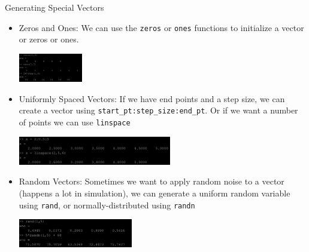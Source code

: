 {}\documentclass[letterpaper,
compress,
xcolor=x11names,
]{beamer}
\begin{document}

\begin{frame}{Generating Special Vectors}
	\footnotesize
	\begin{itemize}
		\item Zeros and Ones: We can use the \texttt{zeros} or \texttt{ones} functions to initialize a vector or zeros or ones.
		\begin{center}
			\includegraphics[height = 1.25cm]{ones_and_zeros.png}
		\end{center}
		\item<2-> Uniformly Spaced Vectors: If we have end points and a step size, we can create a vector using \texttt{start\_pt:step\_size:end\_pt}. Or if we want a number of points we can use \texttt{linspace}
		\begin{center}
			\includegraphics[height = 1.25cm]{uniform_vectors.png}
		\end{center}
		\item<3-> Random Vectors: Sometimes we want to apply random noise to a vector (happens a lot in simulation), we can generate a uniform random variable using \texttt{rand}, or normally-distributed using \texttt{randn}
		\begin{center}
			\includegraphics[height = 1.25cm]{random_vectors.png}
		\end{center}
	\end{itemize}
\end{frame}

\end{document}
